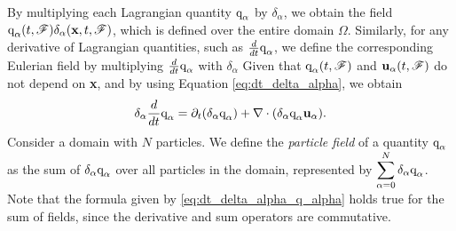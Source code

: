 By multiplying each Lagrangian quantity $\text q_\alpha$​ by $\delta_\alpha$​, we obtain the field $\text q_\alpha(t,\mathscr{F})\delta_\alpha(\textbf{x},t,\mathscr{F})$, which is defined over the entire domain $\Omega$. 
Similarly, for any derivative of Lagrangian quantities, such as $\frac{d}{dt} \text q_\alpha$​, we define the corresponding Eulerian field by multiplying $\frac{d}{dt} \text q_\alpha$ with $\delta_\alpha$ 
Given that $\text q_\alpha(t,\mathscr{F})$ and $\textbf{u}_\alpha(t,\mathscr{F})$ do not depend on \textbf{x}, and by using Equation \ref{eq:dt_delta_alpha}, we obtain
\begin{equation}
    \delta_\alpha \frac{d}{dt} \text q_\alpha
    = \partial_t (\delta_\alpha \text q_\alpha)
    + \mathbf{\nabla}\cdot (\delta_\alpha \text q_\alpha \textbf{u}_\alpha).
    \label{eq:dt_delta_alpha_q_alpha}
\end{equation}
Consider a domain with $N$ particles. We define the \textit{particle field} of a quantity $\text q_\alpha$​ as the sum of $\delta_\alpha \text q_\alpha$ over all particles in the domain, represented by $\displaystyle\sum_{\alpha=0}^N \delta_\alpha \text q_\alpha$​. 
Note that the formula given by \ref{eq:dt_delta_alpha_q_alpha} holds true for the sum of fields, since the derivative and sum operators are commutative.

